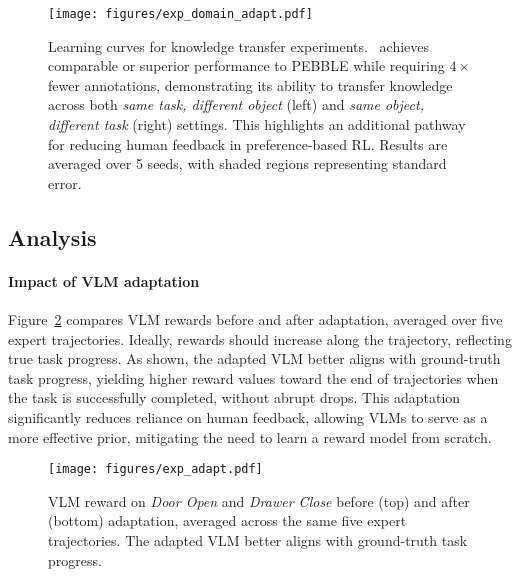 \begin{figure}[t]
    \centering
    \texttt{[image: figures/exp\_domain\_adapt.pdf]}
    \caption{Learning curves for knowledge transfer experiments. \algo~achieves comparable or superior performance to PEBBLE while requiring $4\times$ fewer annotations, demonstrating its ability to transfer knowledge across both \emph{same task, different object} (left) and \emph{same object, different task} (right) settings. This highlights an additional pathway for reducing human feedback in preference-based RL. Results are averaged over 5 seeds, with shaded regions representing standard error.}
    \label{fig:transfer_results}
\end{figure}


\subsection{Analysis} \label{sec:exp_analysis}

\paragraph{Impact of VLM adaptation} 
Figure~\ref{fig:adapted_vlm} compares VLM rewards before and after adaptation, averaged over five expert trajectories. Ideally, rewards should increase along the trajectory, reflecting true task progress. As shown, the adapted VLM better aligns with ground-truth task progress, yielding higher reward values toward the end of trajectories when the task is successfully completed, without abrupt drops. This adaptation significantly reduces reliance on human feedback, allowing VLMs to serve as a more effective prior, mitigating the need to learn a reward model from scratch.
\begin{figure}[t]
    \centering
    \texttt{[image: figures/exp\_adapt.pdf]}
    \caption{VLM reward on \emph{Door Open} and \emph{Drawer Close} before (top) and after (bottom) adaptation, averaged across the same five expert trajectories. The adapted VLM better aligns with ground-truth task progress.}
    \vspace{-0.2cm}
    \label{fig:adapted_vlm}
\end{figure}

